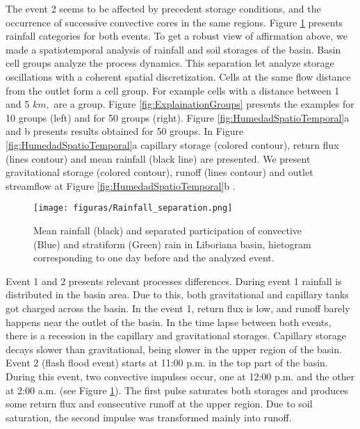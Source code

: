 {The event 2 seems to be affected by precedent storage conditions, and the occurrence of successive convective cores in the same regions.  Figure \ref{fig:separacionLluvia} presents rainfall categories for  both events.  To get a robust view of affirmation above, we made a spatiotemporal analysis of rainfall and soil storages of the basin.   Basin cell groups analyze the process dynamics.  This separation let analyze storage oscillations with a coherent spatial discretization.  Cells at the same flow distance from the outlet form a cell group.  For example cells with a distance between 1 and 5 $km,$ are a group.  Figure \ref{fig:ExplainationGroups} presents the examples for 10 groups (left) and for 50 groups (right).  Figure \ref{fig:HumedadSpatioTemporal}a and b presents results obtained for 50 groups. In Figure \ref{fig:HumedadSpatioTemporal}a capillary storage (colored contour), return flux (lines contour) and mean rainfall (black line) are presented.  We present gravitational storage (colored contour), runoff (lines contour) and outlet streamflow at Figure \ref{fig:HumedadSpatioTemporal}b .\\

\begin{figure}[t]
\centering
 \texttt{[image: figuras/Rainfall\_separation.png]}
 \caption{Mean rainfall (black) and separated participation of convective (Blue) and stratiform (Green) rain in       Liboriana basin, hietogram corresponding to one day before and the analyzed event.}
    \label{fig:separacionLluvia}
\end{figure}

Event 1 and 2 presents relevant processes differences. During event 1 rainfall is distributed in the basin area. Due to this, both gravitational and capillary tanks got charged across the basin. In the event 1, return flux is low, and runoff barely happens near the outlet of the basin.  In the time lapse between both events, there is a recession in the capillary and gravitational storages. Capillary storage decays slower than gravitational, being slower in the upper region of the basin.  Event 2 (flash flood event) starts at 11:00 p.m. in the top part of the basin.  During this event, two convective impulses occur, one at 12:00 p.m. and the other at 2:00 a.m.  (see Figure \ref{fig:separacionLluvia}). The first pulse saturates both storages and produces some return flux and consecutive runoff at the upper region.  Due to soil saturation, the second impulse was transformed mainly into runoff.\\   

}
